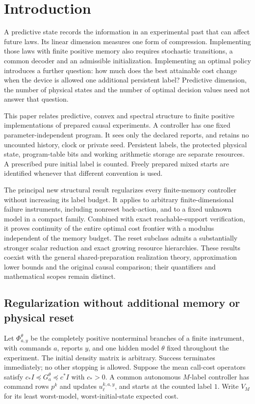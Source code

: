 \section{Introduction}\label{sec:current-overview}\label{sec:introduction}

A predictive state records the information in an experimental past that
can affect future laws.  Its linear dimension measures one form of
compression.  Implementing those laws with finite positive memory also
requires stochastic transitions, a common decoder and an admissible
initialization.  Implementing an optimal policy introduces a further
question: how much does the best attainable cost change when the device
is allowed one additional persistent label?  Predictive dimension,
the number of physical states and the number of optimal decision values
need not answer that question.

This paper relates predictive, convex and spectral structure to finite
positive implementations of prepared causal experiments.  A controller
has one fixed parameter-independent program.  It sees only the declared
reports, and retains no uncounted history, clock or private seed.
Persistent labels, the protected physical state, program-table bits and
working arithmetic storage are separate resources.  A prescribed pure
initial label is counted.  Freely prepared mixed starts are identified
whenever that different convention is used.

The principal new structural result regularizes every finite-memory
controller without increasing its label budget.  It applies to arbitrary
finite-dimensional failure instruments, including nonreset back-action,
and to a fixed unknown model in a compact family.  Combined with exact
reachable-support verification, it proves continuity of the entire
optimal cost frontier with a modulus independent of the memory budget.
The reset subclass admits a substantially stronger scalar reduction
and exact growing resource hierarchies.  These results coexist with the
general shared-preparation realization theory, approximation lower
bounds and the original causal comparison; their quantifiers and
mathematical scopes remain distinct.

\subsection*{Regularization without additional memory or physical reset}

Let $\Phi^\theta_{a,y}$ be the completely positive nonterminal branches
of a finite instrument, with commands $a$, reports $y$, and one hidden
model $\theta$ fixed throughout the experiment.  The initial density
matrix is arbitrary.  Success terminates immediately; no other stopping
is allowed.  Suppose the mean call-cost operators satisfy
$c_*I\preccurlyeq G^\theta_a\preccurlyeq c^*I$ with $c_*>0$.
A common autonomous $M$-label controller has command rows $p^k$ and
updates $u^{k,a,y}_\ell$, and starts at the counted label $1$.
Write $V_M$ for its least worst-model, worst-initial-state expected cost.

